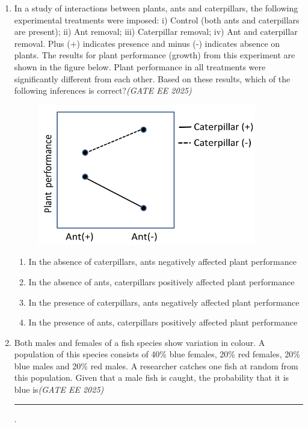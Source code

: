 \documentclass[11pt,a4paper]{article}
\begin{document}
\begin{enumerate}[leftmargin=*,label=\textbf{Q.\arabic*},resume]
\item In a study of interactions between plants, ants and caterpillars, the following experimental treatments were imposed: i) Control (both ants and caterpillars are present); ii) Ant removal; iii) Caterpillar removal; iv) Ant and caterpillar removal. Plus (+) indicates presence and minus (-) indicates absence on plants. The results for plant performance (growth) from this experiment are shown in the figure below. Plant performance in all treatments were significantly different from each other. Based on these results, which of the following inferences is correct?\hfill \textit{(GATE EE 2025)}
\vspace{1em}
\begin{figure}[h!]
    \centering
    \includegraphics[width=0.9\textwidth]{imageQ48.png}
\end{figure}
\vspace{1em}
\begin{multicols}{2}
\begin{enumerate}[label=(\Alph*)]
\item In the absence of caterpillars, ants negatively affected plant performance
\item In the absence of ants, caterpillars positively affected plant performance
\item In the presence of caterpillars, ants negatively affected plant performance
\item In the presence of ants, caterpillars positively affected plant performance
\end{enumerate}
\end{multicols}

\item Both males and females of a fish species show variation in colour. A population of this species consists of 40\% blue females, 20\% red females, 20\% blue males and 20\% red males. A researcher catches one fish at random from this population. Given that a male fish is caught, the probability that it is blue is\hfill \textit{(GATE EE 2025)} \rule{4cm}{0.15mm}.


\end{enumerate}
\end{document}
